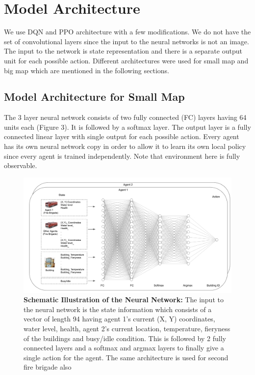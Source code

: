 \documentclass[12pt]{report}
\begin{document}
\section{Model Architecture}

We use DQN and PPO architecture with a few modifications. We do not have the set of convolutional layers since the input to the neural networks is not an image. The input to the network is state representation and there is a separate output unit for each possible action. Different architectures were used for small map and big map which are mentioned in the following sections. 

\subsection{Model Architecture for Small Map} The 3 layer neural network consists of two fully connected (FC) layers having 64 units each (Figure 3). It is followed by a softmax layer. The output layer is a fully connected linear layer with single output for each possible action. Every agent has its own neural network copy in order to allow it to learn its own local policy since every agent is trained independently. Note that environment here is fully observable. 

\begin{figure}[!h]
    \centering
    \includegraphics[width=14cm]{27}
    \caption{\textbf{Schematic Illustration of the Neural Network:} The input to the neural network is the state information which consists of a vector of length 94 having agent 1's current (X, Y) coordinates, water level, health, agent 2's current location, temperature, fieryness of the buildings and busy/idle condition. This is followed by 2 fully connected layers and a softmax and argmax layers to finally give a single action for the agent. The same architecture is used for second fire brigade also}
    \label{fig:x}
\end{figure}
\end{document}
